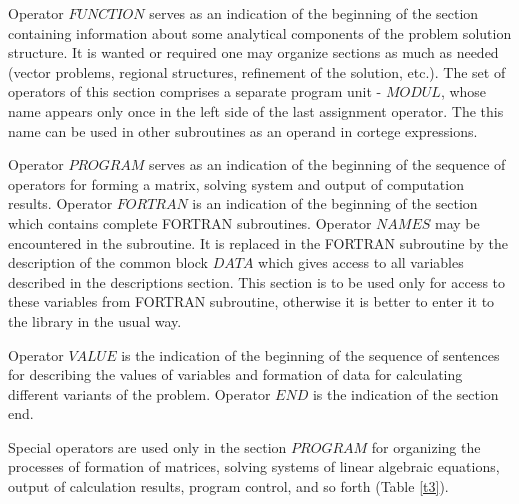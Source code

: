 Operator $FUNCTION$ serves as an indication of the beginning of the section
containing information about some analytical components of the problem
solution structure. It is wanted or required one may organize sections as
much as needed (vector problems, regional structures, refinement of the
solution, etc.). The set of operators of this section comprises a separate
program unit - $MODUL$, whose name appears only once in the left side of the
last assignment operator. The this name can be used in other subroutines as
an operand in cortege expressions.

Operator $PROGRAM$ serves as an indication of the beginning of the sequence
of operators for forming a matrix, solving system and output of computation
results. Operator $FORTRAN$ is an indication of the beginning of the section
which contains complete FORTRAN subroutines. Operator $NAMES$ may be
encountered in the subroutine. It is replaced in the FORTRAN subroutine by
the description of the common block $DATA$ which gives access to all
variables described in the descriptions section. This section is to be used
only for access to these variables from FORTRAN subroutine, otherwise it is
better to enter it to the library in the usual way.

Operator $VALUE$ is the indication of the beginning of the sequence of
sentences for describing the values of variables and formation of data for
calculating different variants of the problem. Operator $END$ is the
indication of the section end.

Special operators are used only in the section $PROGRAM$ for organizing the
processes of formation of matrices, solving systems of linear algebraic
equations, output of calculation results, program control, and so forth
(Table \ref{t3}).

